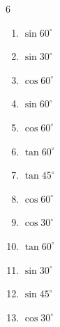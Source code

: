 \begin{multicols}{6}
\begin{enumerate}
  \item $\displaystyle \sin{60^\circ}$


  \item $\displaystyle \sin{30^\circ}$


\columnbreak %

  \item $\displaystyle \cos{60^\circ}$


  \item $\displaystyle \sin{60^\circ}$


  \item $\displaystyle \cos{60^\circ}$


  \item $\displaystyle \tan{60^\circ}$


  \item $\displaystyle \tan{45^\circ}$

        \phantom{$\displaystyle =1$}

  \item $\displaystyle \cos{60^\circ}$


  \item $\displaystyle \cos{30^\circ}$


  \item $\displaystyle \tan{60^\circ}$


  \item $\displaystyle \sin{30^\circ}$


  \item $\displaystyle \sin{45^\circ}$


  \item $\displaystyle \cos{30^\circ}$


\end{enumerate}
\end{multicols}
